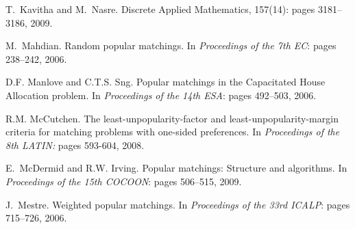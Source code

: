 \documentclass[11pt]{llncs}
\begin{document}
\begin{thebibliography}{10}
T.~Kavitha and M.~Nasre.
\newblock Discrete Applied Mathematics, 157(14): pages 3181--3186, 2009.

M.~Mahdian.
\newblock Random popular matchings.
\newblock In {\em Proceedings of the 7th EC}: pages 238--242, 2006.

D.F. Manlove and C.T.S. Sng.
\newblock Popular matchings in the {C}apacitated {H}ouse {A}llocation problem.
\newblock In {\em Proceedings of the 14th ESA}: pages 492--503, 2006.

R.M. McCutchen.
\newblock The least-unpopularity-factor and least-unpopularity-margin criteria for matching problems with one-sided preferences.
\newblock In {\em Proceedings of the 8th LATIN:} pages 593-604, 2008.

E.~McDermid and R.W. Irving.
\newblock Popular matchings: Structure and algorithms.
\newblock In {\em Proceedings of the 15th COCOON}: pages 506--515,  2009.

J.~Mestre.
\newblock Weighted popular matchings.
\newblock In {\em Proceedings of the 33rd ICALP}: pages 715--726, 2006.
\end{thebibliography}
\end{document}
